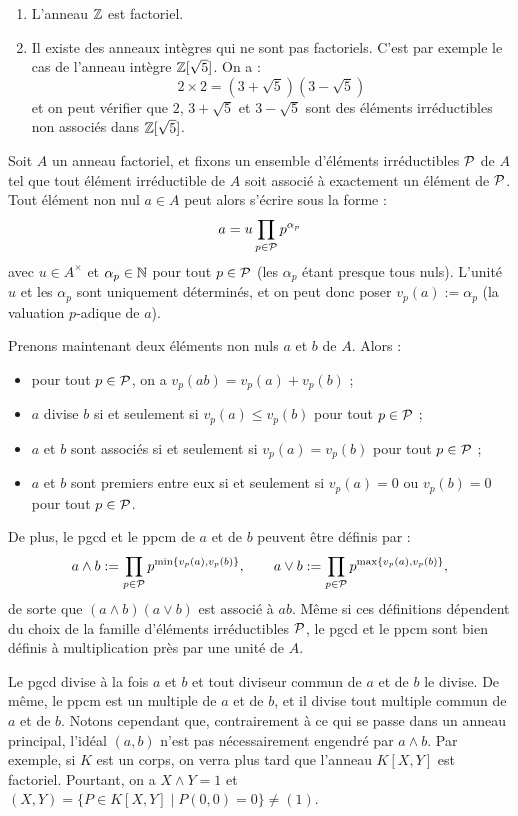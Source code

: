 \documentclass[]{report}
\begin{document}
\begin{ex}{}{}
    \begin{enumerate}
        \item L'anneau $\mathbb{Z}$ est factoriel.
        \item Il existe des anneaux intègres qui ne sont pas factoriels. C'est par exemple le cas de l'anneau intègre $\mathbb{Z}[\sqrt{5}]$. On a :
        \[2 \times 2 = (3 + \sqrt{5})(3 - \sqrt{5})\]
        et on peut vérifier que $2$, $3 + \sqrt{5}$ et $3 - \sqrt{5}$ sont des éléments irréductibles non associés dans $\mathbb{Z}[\sqrt{5}]$.
    \end{enumerate}
\end{ex}

Soit $A$ un anneau factoriel, et fixons un ensemble d'éléments irréductibles $\mathcal{P}$ de $A$ tel que tout élément irréductible de $A$ soit associé à exactement un élément de $\mathcal{P}$. Tout élément non nul $a \in A$ peut alors s'écrire sous la forme :
\[a = u \prod_{p \in \mathcal{P}} p^{\alpha_p}\]
avec $u \in A^{\times}$ et $\alpha_p \in \mathbb{N}$ pour tout $p \in \mathcal{P}$ (les $\alpha_p$ étant presque tous nuls). L'unité $u$ et les $\alpha_p$ sont uniquement déterminés, et on peut donc poser $v_p(a) := \alpha_p$ (la valuation $p$-adique de $a$).

Prenons maintenant deux éléments non nuls $a$ et $b$ de $A$. Alors :
\begin{itemize}
    \item[(i)] pour tout $p \in \mathcal{P}$, on a $v_p(ab) = v_p(a) + v_p(b)$ ;
    \item[(ii)] $a$ divise $b$ si et seulement si $v_p(a) \le v_p(b)$ pour tout $p \in \mathcal{P}$ ;
    \item[(iii)] $a$ et $b$ sont associés si et seulement si $v_p(a) = v_p(b)$ pour tout $p \in \mathcal{P}$ ;
    \item[(iv)] $a$ et $b$ sont premiers entre eux si et seulement si $v_p(a) = 0$ ou $v_p(b) = 0$ pour tout $p \in \mathcal{P}$.
\end{itemize}
De plus, le pgcd et le ppcm de $a$ et de $b$ peuvent être définis par :
\[a \wedge b := \prod_{p \in \mathcal{P}} p^{\min\{v_p(a), v_p(b)\}}, \qquad a \vee b := \prod_{p \in \mathcal{P}} p^{\max\{v_p(a), v_p(b)\}},\]
de sorte que $(a \wedge b)(a \vee b)$ est associé à $ab$. Même si ces définitions dépendent du choix de la famille d'éléments irréductibles $\mathcal{P}$, le pgcd et le ppcm sont bien définis à multiplication près par une unité de $A$.

Le pgcd divise à la fois $a$ et $b$ et tout diviseur commun de $a$ et de $b$ le divise. De même, le ppcm est un multiple de $a$ et de $b$, et il divise tout multiple commun de $a$ et de $b$. Notons cependant que, contrairement à ce qui se passe dans un anneau principal, l'idéal $(a, b)$ n'est pas nécessairement engendré par $a \wedge b$. Par exemple, si $K$ est un corps, on verra plus tard que l'anneau $K[X, Y]$ est factoriel. Pourtant, on a $X \wedge Y = 1$ et $(X, Y) = \{P \in K[X, Y] \mid P(0, 0) = 0\} \neq (1)$.
\end{document}
